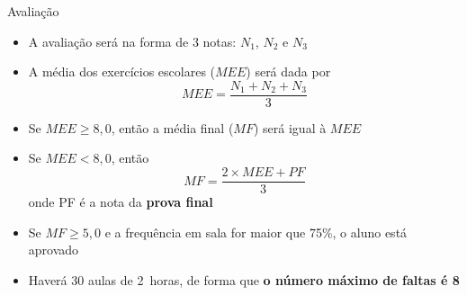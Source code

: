 \begin{frame}{Avaliação}
    \begin{itemize}
        \item A avaliação será na forma de 3 notas: \(N_1\), \(N_2\) e \(N_3\)
        \item A média dos exercícios escolares (\(MEE\)) será dada por
            \[
                MEE=\frac{N_1+N_2+N_3}{3}
            \]
        \item Se \(MEE \geq 8,0\), então a média final (\(MF\)) será igual à \(MEE\)
        \item Se \(MEE < 8,0\), então
            \[
                MF=\frac{2\times MEE+PF}{3}
            \]
            onde PF é a nota da \textbf{prova final}
        \item Se \(MF \geq 5,0\) e a frequência em sala for maior que 75\%, o aluno está aprovado
        \item Haverá 30 aulas de \SI{2}{horas}, de forma que \textbf{o número máximo de faltas é 8}
    \end{itemize}
\end{frame}

